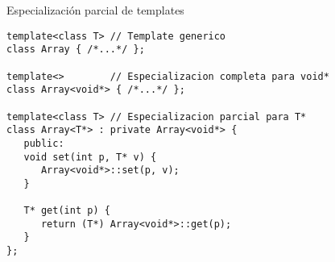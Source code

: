 \begin{frame}[fragile]{Especializaci\'on parcial de templates}
   \begin{lstlisting}[style=normal,linebackgroundcolor={%
         \only<1>{\def\lst@linebgrdcmd####1####2####3{}}%
         \btLstHLB<2>{1-2}% template generico T
         \btLstHLB<3>{4-5}% template especializado para void*
         \btLstHLB<4>{7-8}% template parcialmente especializado para T*
         \btLstHLB<5>{11,15}% solo casteos, toda la implementacion queda del lado de Array<void*>
   }]
template<class T> // Template generico
class Array { /*...*/ };

template<>        // Especializacion completa para void*
class Array<void*> { /*...*/ };

template<class T> // Especializacion parcial para T*
class Array<T*> : private Array<void*> {
   public:
   void set(int p, T* v) {
      Array<void*>::set(p, v);
   }

   T* get(int p) {
      return (T*) Array<void*>::get(p);
   }
};
   \end{lstlisting}
\end{frame}

